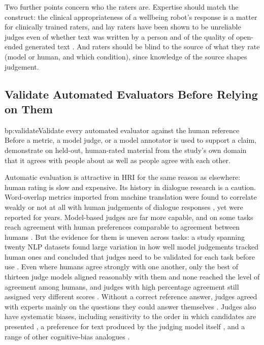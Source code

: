 Two further points concern who the raters are. Expertise should match the
construct: the clinical appropriateness of a wellbeing robot's response is a
matter for clinically trained raters, and lay raters have been shown to be
unreliable judges even of whether text was written by a person
\cite{clark2021all} and of the quality of open-ended generated text
\cite{karpinska2021perils}. And raters should be blind to the source of what
they rate (model or human, and which condition), since knowledge of the
source shapes judgement.

\subsection{Validate Automated Evaluators Before Relying on Them}

\begin{practice}{bp:validate}{Validate every automated evaluator against the human reference}
Before a metric, a model judge, or a model annotator is used to support a
claim, demonstrate on held-out, human-rated material from the study's own
domain that it agrees with people about as well as people agree with each
other.
\end{practice}

Automatic evaluation is attractive in HRI for the same reason as elsewhere:
human rating is slow and expensive. Its history in dialogue research is a
caution. Word-overlap metrics imported from machine translation were found to
correlate weakly or not at all with human judgements of dialogue responses
\cite{liu2016how}, yet were reported for years. Model-based judges are far
more capable, and on some tasks reach agreement with human preferences
comparable to agreement between humans \cite{zheng2023judging,chiang2023can}.
But the evidence for them is uneven across tasks: a study spanning twenty NLP
datasets found large variation in how well model judgements tracked human
ones and concluded that judges need to be validated for each task before use
\cite{bavaresco2025llms}. Even where humans agree strongly with one
another, only the best of thirteen judge models aligned reasonably with them
and none reached the level of agreement among humans, and judges with high
percentage agreement still assigned very different scores
\cite{thakur2025judging}. Without a correct reference answer, judges agreed
with experts mainly on the questions they could answer themselves
\cite{krumdick2026no}. Judges also have systematic biases, including
sensitivity to the order in which candidates are presented
\cite{wang2024large}, a preference for text produced by the judging model
itself \cite{panickssery2024llm}, and a range of other cognitive-bias
analogues \cite{koo2024benchmarking}.

